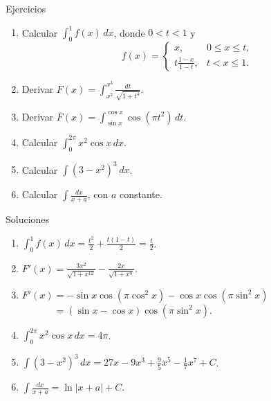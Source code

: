 \documentclass[original_version/main.tex]{subfiles}
\begin{document}
\begin{frame}{Ejercicios}
\scriptsize\begin{enumerate}\item Calcular $\int_0^1 f(x)\,dx$, donde $0<t<1$ y\[f(x)=\begin{cases}x,&0\le x\le t,\\\displaystyle t\frac{1-x}{1-t},&t<x\le1.\end{cases}\]\item Derivar $F(x)=\displaystyle\int_{x^2}^{x^3}\frac{dt}{\sqrt{1+t^4}}$.\item Derivar $F(x)=\displaystyle\int_{\sin x}^{\cos x}\cos(\pi t^2)\,dt$.\item Calcular $\displaystyle\int_0^{2\pi}x^2\cos x\,dx$.\item Calcular $\displaystyle\int(3-x^2)^3\,dx$.\item Calcular $\displaystyle\int\frac{dx}{x+a}$, con $a$ constante.\end{enumerate}
\end{frame}

\begin{frame}{Soluciones}
\footnotesize\begin{enumerate}\item $\displaystyle\int_0^1f(x)\,dx=\frac{t^2}{2}+\frac{t(1-t)}2=\boxed{\frac t2}$.\item $\displaystyle F\prime(x)=\frac{3x^2}{\sqrt{1+x^{12}}}-\frac{2x}{\sqrt{1+x^8}}$.\item $\displaystyle F\prime(x)=-\sin x\cos(\pi\cos^2x)-\cos x\cos(\pi\sin^2x)$\\$\displaystyle\phantom{F\prime(x)}=(\sin x-\cos x)\cos(\pi\sin^2x)$.\item $\displaystyle\int_0^{2\pi}x^2\cos x\,dx=4\pi$.\item $\displaystyle\int(3-x^2)^3\,dx=27x-9x^3+\frac95x^5-\frac17x^7+C$.\item $\displaystyle\int\frac{dx}{x+a}=\ln|x+a|+C$.\end{enumerate}
\end{frame}
\end{document}
